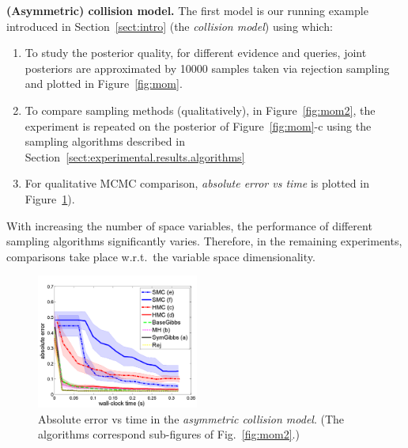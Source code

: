 \documentclass[]{article}
\begin{document}
{\bf(Asymmetric) collision model.}  
The first model is our running example introduced in 
Section~\ref{sect:intro} (the \emph{collision model}) using which: 
\vspace{-2mm}
\begin{enumerate}
\item To study the posterior quality, for different evidence and queries, joint posteriors are approximated by 10000 samples taken via rejection sampling
and plotted in Figure~\ref{fig:mom}.
\item    
To  compare sampling methods (qualitatively), 
in Figure~\ref{fig:mom2}, the experiment is repeated on the posterior of 
Figure~\ref{fig:mom}-c using the sampling algorithms described in Section~\ref{sect:experimental.results.algorithms}
\item
For qualitative MCMC comparison, \emph{absolute error vs time}
is plotted in Figure~\ref{fig:asymmetric}).
\end{enumerate}

With increasing the number of space variables, the performance of different sampling algorithms significantly varies.
Therefore,
in the remaining experiments, comparisons take place w.r.t.\ the variable space dimensionality.
 
\begin{figure}
\centering
     \includegraphics[width=0.8\linewidth, height=125pt]
{plotsx/vis-col/err-vs-time__param2-shaded.pdf}
      \caption{
Absolute error vs time in the \emph{asymmetric collision model}. (The algorithms correspond sub-figures of Fig.~\ref{fig:mom2}.)
 }
\label{fig:asymmetric}
\end{figure}
\end{document}
